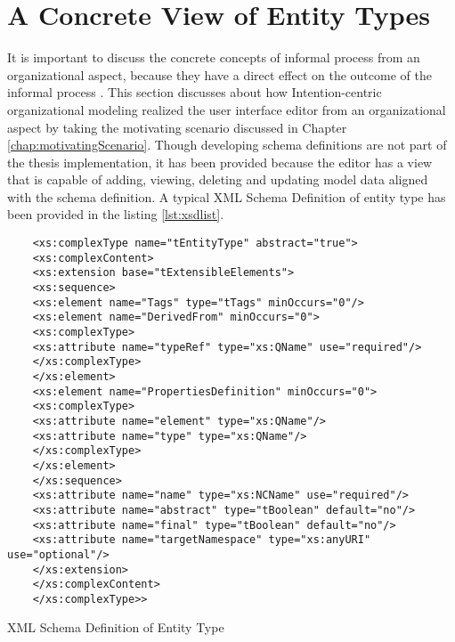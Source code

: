 \section{A Concrete View of Entity Types}
\label{sec:concreteviewofentitytypes}
It is important to discuss the concrete concepts of informal process from an organizational aspect, because they have a direct effect on the outcome of the informal process \cite{Sungur2014}. This section discusses about how Intention-centric organizational modeling realized the user interface editor from an organizational aspect by taking the motivating scenario discussed in Chapter \ref {chap:motivatingScenario}. Though developing schema definitions are not part of the thesis implementation, it has been provided because the editor has a view that is capable of adding, viewing, deleting and updating model data aligned with the schema definition. A typical XML Schema Definition of entity type has been provided in the listing \ref{lst:xsdlist}.

\begin{Listing}
	\begin{lstlisting}
	<xs:complexType name="tEntityType" abstract="true">
	<xs:complexContent>
	<xs:extension base="tExtensibleElements">
	<xs:sequence>
	<xs:element name="Tags" type="tTags" minOccurs="0"/>
	<xs:element name="DerivedFrom" minOccurs="0">
	<xs:complexType>
	<xs:attribute name="typeRef" type="xs:QName" use="required"/>
	</xs:complexType>
	</xs:element>
	<xs:element name="PropertiesDefinition" minOccurs="0">
	<xs:complexType>
	<xs:attribute name="element" type="xs:QName"/>
	<xs:attribute name="type" type="xs:QName"/>
	</xs:complexType>
	</xs:element>
	</xs:sequence>
	<xs:attribute name="name" type="xs:NCName" use="required"/>
	<xs:attribute name="abstract" type="tBoolean" default="no"/>
	<xs:attribute name="final" type="tBoolean" default="no"/>
	<xs:attribute name="targetNamespace" type="xs:anyURI" use="optional"/>
	</xs:extension>
	</xs:complexContent>
	</xs:complexType>>
	\end{lstlisting}
	\caption{XML Schema Definition of Entity Type}
	\label{lst:xsdlist}
\end{Listing}

